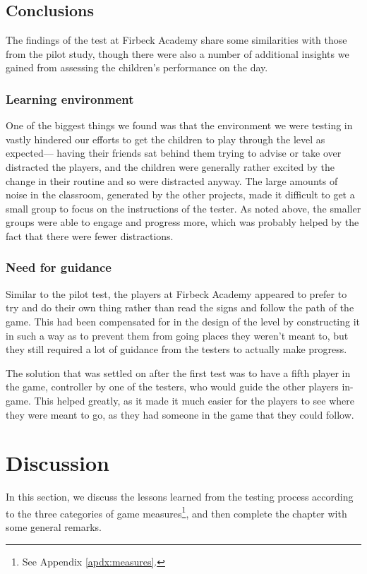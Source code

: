 \subsection{Conclusions}
The findings of the test at Firbeck Academy share some similarities with those
from the pilot study, though there were also a number of additional insights we
gained from assessing the children's performance on the day.

\subsubsection{Learning environment}
One of the biggest things we found was that the environment we were testing in
vastly hindered our efforts to get the children to play through the level as expected---
having their friends sat behind them trying to advise or take over distracted the
players, and the children were generally rather excited by the change in their
routine and so were distracted anyway. The large amounts of noise in the classroom,
generated by the other projects, made it difficult to get a small group to
focus on the instructions of the tester. As noted above, the smaller groups were
able to engage and progress more, which was probably helped by the fact that there
were fewer distractions.

\subsubsection{Need for guidance}
Similar to the pilot test, the players at Firbeck Academy appeared to prefer to try
and do their own thing rather than read the signs and follow the path of the game.
This had been compensated for in the design of the level by constructing it in
such a way as to prevent them from going places they weren't meant to, but they
still required a lot of guidance from the testers to actually make progress.

The solution that was settled on after the first test was to have a fifth player
in the game, controller by one of the testers, who would guide the other players
in-game. This helped greatly, as it made it much easier for the players to
see where they were meant to go, as they had someone in the game that they could follow.


\section{Discussion}
In this section, we discuss the lessons learned from the testing process according
to the three categories of game measures\footnote{See Appendix \ref{apdx:measures}.},
and then complete the chapter with some general remarks.


